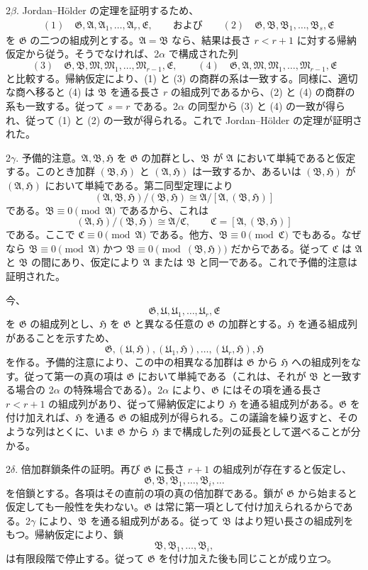 \documentclass[11pt]{article}
\providecommand{\mM}{\mathfrak{M}}
\providecommand{\mA}{\mathfrak{A}}
\providecommand{\mB}{\mathfrak{B}}
\providecommand{\mC}{\mathfrak{C}}
\providecommand{\mE}{\mathfrak{E}}
\providecommand{\mG}{\mathfrak{G}}
\providecommand{\mH}{\mathfrak{H}}
\providecommand{\mU}{\mathfrak{U}}
\begin{document}
2$\beta$. Jordan--Hölder の定理を証明するため、
\[
\begin{aligned}
&(1)\quad \mG,\mA,\mA_1,\ldots,\mA_r,\mE,\qquad\text{および}\qquad
(2)\quad \mG,\mB,\mB_1,\ldots,\mB_s,\mE
\end{aligned}
\]
を $\mG$ の二つの組成列とする。$\mA=\mB$ なら、結果は長さ $r<r+1$ に対する帰納仮定から従う。そうでなければ、2$\alpha$ で構成された列
\[
        (3)\quad \mG,\mB,\mM,\mM_1,\ldots,\mM_{r-1},\mE,
        \qquad
        (4)\quad \mG,\mA,\mM,\mM_1,\ldots,\mM_{r-1},\mE
\]
と比較する。帰納仮定により、(1) と (3) の商群の系は一致する。同様に、適切な商へ移ると (4) は $\mB$ を通る長さ $r$ の組成列であるから、(2) と (4) の商群の系も一致する。従って $s=r$ である。2$\alpha$ の同型から (3) と (4) の一致が得られ、従って (1) と (2) の一致が得られる。これで Jordan--Hölder の定理が証明された。

2$\gamma$. 予備的注意。$\mA,\mB,\mH$ を $\mG$ の加群とし、$\mB$ が $\mA$ において単純であると仮定する。このとき加群 $(\mB,\mH)$ と $(\mA,\mH)$ は一致するか、あるいは $(\mB,\mH)$ が $(\mA,\mH)$ において単純である。第二同型定理により
\[
        (\mA,\mB,\mH)/(\mB,\mH)
        \cong
        \mA/[\mA,(\mB,\mH)]
\]
である。$\mB\equiv0\pmod{\mA}$ であるから、これは
\[
        (\mA,\mH)/(\mB,\mH)\cong \mA/\mC,
        \qquad \mC=[\mA,(\mB,\mH)]
\]
である。ここで $\mC\equiv0\pmod{\mA}$ である。他方、$\mB\equiv0\pmod{\mC}$ でもある。なぜなら $\mB\equiv0\pmod{\mA}$ かつ $\mB\equiv0\pmod{(\mB,\mH)}$ だからである。従って $\mC$ は $\mA$ と $\mB$ の間にあり、仮定により $\mA$ または $\mB$ と同一である。これで予備的注意は証明された。

今、
\[
        \mG,\mU,\mU_1,\ldots,\mU_r,\mE
\]
を $\mG$ の組成列とし、$\mH$ を $\mG$ と異なる任意の $\mG$ の加群とする。$\mH$ を通る組成列があることを示すため、
\[
        \mG,(\mU,\mH),(\mU_1,\mH),\ldots,(\mU_r,\mH),\mH
\]
を作る。予備的注意により、この中の相異なる加群は $\mG$ から $\mH$ への組成列をなす。従って第一の真の項は $\mG$ において単純である（これは、それが $\mB$ と一致する場合の 2$\alpha$ の特殊場合である）。2$\alpha$ により、$\mG$ にはその項を通る長さ $r<r+1$ の組成列があり、従って帰納仮定により $\mH$ を通る組成列がある。$\mG$ を付け加えれば、$\mH$ を通る $\mG$ の組成列が得られる。この議論を繰り返すと、そのような列はとくに、いま $\mG$ から $\mH$ まで構成した列の延長として選べることが分かる。

2$\delta$. 倍加群鎖条件の証明。再び $\mG$ に長さ $r+1$ の組成列が存在すると仮定し、
\[
        \mG,\mB,\mB_1,\ldots,\mB_i,\ldots
\]
を倍鎖とする。各項はその直前の項の真の倍加群である。鎖が $\mG$ から始まると仮定しても一般性を失わない。$\mG$ は常に第一項として付け加えられるからである。2$\gamma$ により、$\mB$ を通る組成列がある。従って $\mB$ はより短い長さの組成列をもつ。帰納仮定により、鎖
\[
        \mB,\mB_1,\ldots,\mB_i,
\]
は有限段階で停止する。従って $\mG$ を付け加えた後も同じことが成り立つ。
\end{document}
